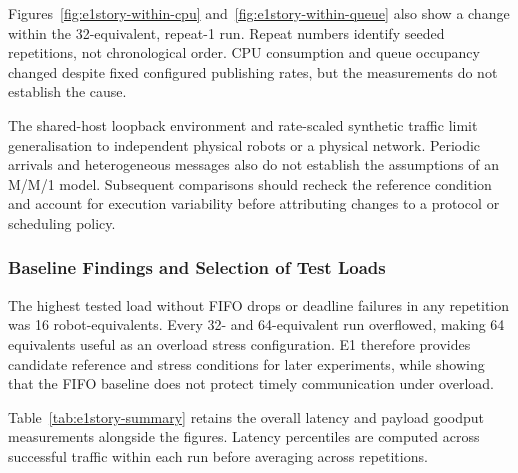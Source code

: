 Figures~\ref{fig:e1story-within-cpu}
and~\ref{fig:e1story-within-queue} also show a change within the
32-equivalent, repeat-1 run. Repeat numbers identify seeded repetitions,
not chronological order. CPU consumption and queue occupancy changed
despite fixed configured publishing rates, but the measurements do not
establish the cause.

The shared-host loopback environment and rate-scaled synthetic traffic
limit generalisation to independent physical robots or a physical
network. Periodic arrivals and heterogeneous messages also do not
establish the assumptions of an M/M/1 model. Subsequent comparisons
should recheck the reference condition and account for execution
variability before attributing changes to a protocol or scheduling policy.

\subsubsection{Baseline Findings and Selection of Test Loads}

The highest tested load without FIFO drops or deadline failures in any
repetition was 16 robot-equivalents. Every 32- and 64-equivalent run
overflowed, making 64 equivalents useful as an overload stress
configuration. E1 therefore provides candidate reference and stress
conditions for later experiments, while showing that the FIFO baseline
does not protect timely communication under overload.

Table~\ref{tab:e1story-summary} retains the overall latency and payload
goodput measurements alongside the figures. Latency percentiles are
computed across successful traffic within each run before averaging
across repetitions.

